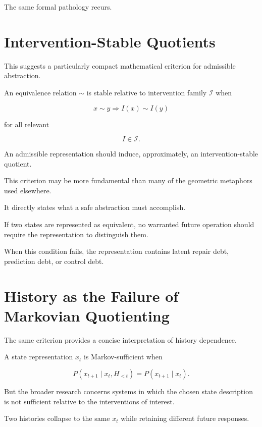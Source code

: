 \documentclass[11pt]{article}
\theoremstyle{remark}
\begin{document}
The same formal pathology recurs.

\section{Intervention-Stable Quotients}

This suggests a particularly compact mathematical criterion for admissible abstraction.

An equivalence relation $\sim$ is stable relative to intervention family $\mathcal{I}$ when

\begin{equation}
x\sim y
\Rightarrow
I(x)\sim I(y)
\end{equation}

for all relevant

\begin{equation}
I\in\mathcal{I}.
\end{equation}

An admissible representation should induce, approximately, an intervention-stable quotient.

This criterion may be more fundamental than many of the geometric metaphors used elsewhere.

It directly states what a safe abstraction must accomplish.

If two states are represented as equivalent, no warranted future operation should require the representation to distinguish them.

When this condition fails, the representation contains latent repair debt, prediction debt, or control debt.

\section{History as the Failure of Markovian Quotienting}

The same criterion provides a concise interpretation of history dependence.

A state representation $x_t$ is Markov-sufficient when

\begin{equation}
P(x_{t+1}\mid x_t,H_{<t})
=
P(x_{t+1}\mid x_t).
\end{equation}

But the broader research concerns systems in which the chosen state description is not sufficient relative to the interventions of interest.

Two histories collapse to the same $x_t$ while retaining different future responses.
\end{document}

